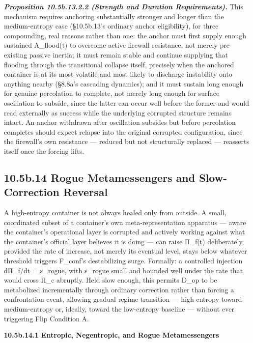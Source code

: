 \documentclass[
]{article}
\begin{document}
\emph{\textbf{Proposition 10.5b.13.2.2 (Strength and Duration
Requirements).}} This mechanism requires anchoring substantially
stronger and longer than the medium-entropy case (§10.5b.13's ordinary
anchor eligibility), for three compounding, real reasons rather than
one: the anchor must first supply enough sustained A\_flood(t) to
overcome active firewall resistance, not merely pre-existing passive
inertia; it must remain stable and continue supplying that flooding
through the transitional collapse itself, precisely when the anchored
container is at its most volatile and most likely to discharge
instability onto anything nearby (§8.8a's cascading dynamics); and it
must sustain long enough for genuine percolation to complete, not merely
long enough for surface oscillation to subside, since the latter can
occur well before the former and would read externally as success while
the underlying corrupted structure remains intact. An anchor withdrawn
after oscillation subsides but before percolation completes should
expect relapse into the original corrupted configuration, since the
firewall's own resistance --- reduced but not structurally replaced ---
reasserts itself once the forcing lifts.

\hypertarget{b.14-rogue-metamessengers-and-slow-correction-reversal}{%
\subsection{10.5b.14 Rogue Metamessengers and Slow-Correction
Reversal}\label{b.14-rogue-metamessengers-and-slow-correction-reversal}}

A high-entropy container is not always healed only from outside. A
small, coordinated subset of a container's own meta-representation
apparatus --- aware the container's operational layer is corrupted and
actively working against what the container's official layer believes it
is doing --- can raise Π\_f(t) deliberately, provided the rate of
increase, not merely its eventual level, stays below whatever threshold
triggers F\_conf's destabilizing surge. Formally: a controlled injection
dΠ\_f/dt = ε\_rogue, with ε\_rogue small and bounded well under the rate
that would cross Π\_c abruptly. Held slow enough, this permits D\_op to
be metabolized incrementally through ordinary correction rather than
forcing a confrontation event, allowing gradual regime transition ---
high-entropy toward medium-entropy or, ideally, toward the low-entropy
baseline --- without ever triggering Flip Condition A.

\textbf{10.5b.14.1 Entropic, Negentropic, and Rogue Metamessengers}
\end{document}
